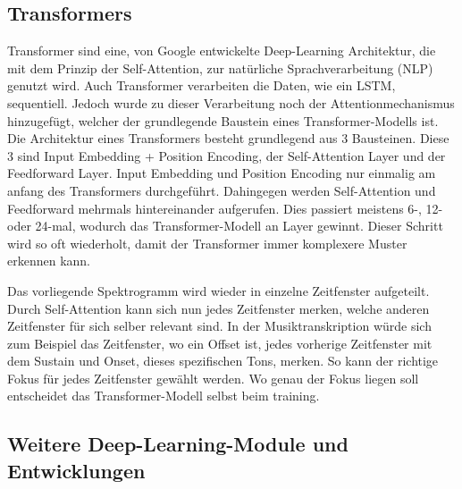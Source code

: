 \subsection{Transformers}
Transformer sind eine, von Google entwickelte Deep-Learning Architektur,
die mit dem Prinzip der Self-Attention, zur natürliche Sprachverarbeitung (NLP) genutzt wird.
Auch Transformer verarbeiten die Daten, wie ein LSTM, sequentiell.
Jedoch wurde zu dieser Verarbeitung noch der Attentionmechanismus hinzugefügt,
welcher der grundlegende Baustein eines Transformer-Modells ist.
Die Architektur eines Transformers besteht grundlegend aus 3 Bausteinen.
Diese 3 sind Input Embedding + Position Encoding, der Self-Attention Layer und der Feedforward Layer.
Input Embedding und Position Encoding nur einmalig am anfang des Transformers durchgeführt.
Dahingegen werden Self-Attention und Feedforward mehrmals hintereinander aufgerufen.
Dies passiert meistens 6-, 12- oder 24-mal, wodurch das Transformer-Modell an Layer gewinnt.
Dieser Schritt wird so oft wiederholt, damit der Transformer immer komplexere Muster erkennen kann.

Das vorliegende Spektrogramm wird wieder in einzelne Zeitfenster aufgeteilt.
Durch Self-Attention kann sich nun jedes Zeitfenster merken, welche anderen Zeitfenster für sich selber relevant sind.
In der Musiktranskription würde sich zum Beispiel das Zeitfenster, wo ein Offset ist,
jedes vorherige Zeitfenster mit dem Sustain und Onset, dieses spezifischen Tons, merken.
So kann der richtige Fokus für jedes Zeitfenster gewählt werden.
Wo genau der Fokus liegen soll entscheidet das Transformer-Modell selbst beim training.

\subsection{Weitere Deep-Learning-Module und Entwicklungen}

